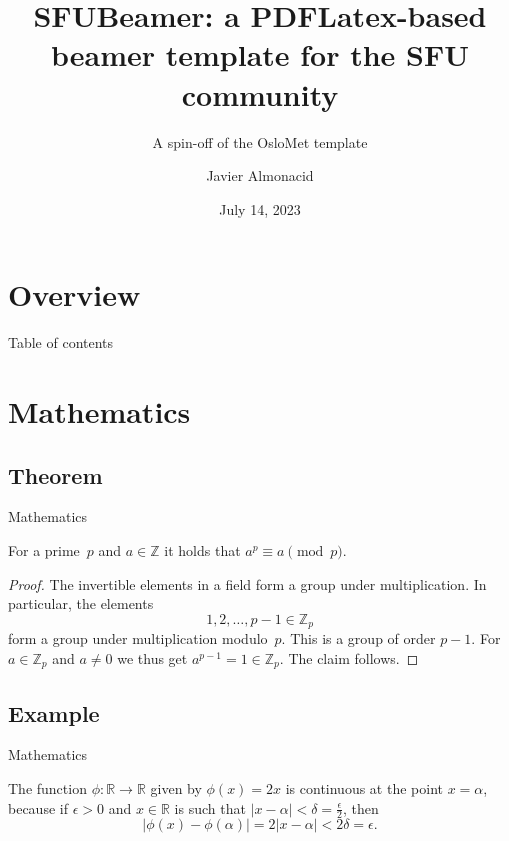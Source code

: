 \documentclass[USenglish, aspectratio = 169]{beamer}
\title[An SFU Beamer Template]{SFUBeamer: a PDFLatex-based beamer template for the SFU community}
\subtitle{A spin-off of the OsloMet template}
\author[J. Almonacid]{Javier Almonacid}
\institute{Department of Mathematics | Simon Fraser University}
\date{July 14, 2023}  %
\begin{document}
\section{Overview}
%
%
\begin{frame}{Table of contents}
    \tableofcontents
\end{frame}


\section{Mathematics}
\subsection{Theorem}

\hidelogo

\begin{frame}{Mathematics}

    \begin{theorem}
        For a prime~\(p\) and \(a \in \mathbb{Z}\) it holds that \(a^p \equiv a \pmod{p}\).
    \end{theorem}

    \begin{proof}
        The invertible elements in a field form a group under multiplication.
        In particular, the elements
        \begin{equation*}
            1, 2, \ldots, p - 1 \in \mathbb{Z}_p
        \end{equation*}
        form a group under multiplication modulo~\(p\).
        This is a group of order \(p - 1\).
        For \(a \in \mathbb{Z}_p\) and \(a \neq 0\) we thus get \(a^{p-1} = 1 \in \mathbb{Z}_p\).
        The claim follows.
    \end{proof}
\end{frame}

\showlogo

\subsection{Example}

\begin{frame}{Mathematics}

    \begin{example}
        The function \(\phi \colon \mathbb{R} \to \mathbb{R}\) given by \(\phi(x) = 2x\) is continuous at the point \(x = \alpha\),
        because if \(\epsilon > 0\) and \(x \in \mathbb{R}\) is such that \(\lvert x - \alpha \rvert < \delta = \frac{\epsilon}{2}\),
        then
        \begin{equation*}
            \lvert \phi(x) - \phi(\alpha)\rvert = 2\lvert x - \alpha \rvert < 2\delta = \epsilon.
        \end{equation*}
    \end{example}
\end{frame}
\end{document}

